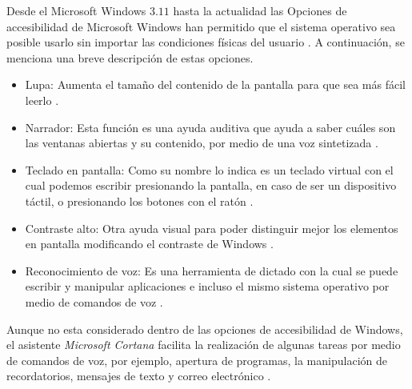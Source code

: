 Desde el Microsoft Windows $3.11$ \cite{RomeroZunica1998} hasta la actualidad las 
 Opciones de accesibilidad de Microsoft Windows han permitido que el
 sistema operativo sea posible usarlo sin importar las condiciones f\'isicas del
 usuario \cite{DanielHubbell2016}. A continuaci\'on, se menciona una breve 
 descripci\'on de estas opciones.

\begin{itemize}
	\item Lupa: Aumenta el tama\~no del contenido de la pantalla para que sea
	 m\'as f\'acil leerlo \cite{xatakaaccesiblilidad}.
	\item Narrador:  Esta funci\'on es una ayuda auditiva que ayuda a saber 
	 cu\'ales son las ventanas abiertas y su contenido, por medio de una voz
	 sintetizada \cite{xatakaaccesiblilidad}.
	\item Teclado en pantalla: Como su nombre lo indica es un teclado virtual
	 con el cual podemos escribir presionando la pantalla, en caso de ser un
	 dispositivo t\'actil, o presionando los botones con el rat\'on
	 \cite{xatakaaccesiblilidad}.
	\item Contraste alto: Otra ayuda visual para poder distinguir mejor los
	 elementos en pantalla modificando el contraste de Windows
	 \cite{xatakaaccesiblilidad}.
	\item Reconocimiento de voz: Es una herramienta de dictado con la cual
	 se puede escribir y manipular aplicaciones e incluso el mismo sistema
	 operativo por medio de comandos de voz \cite{support14213}.
\end{itemize}

Aunque no esta considerado dentro de las opciones de accesibilidad de Windows,
 el asistente \emph{Microsoft Cortana} facilita la realizaci\'on de algunas tareas por medio de
 comandos de voz, por ejemplo, apertura de programas, la manipulaci\'on de
 recordatorios, mensajes de texto y correo electr\'onico \cite{support17214}. 